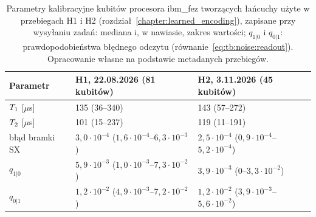 \begin{table}[tb]
\centering
\caption[Parametry kalibracyjne kubitów procesora ibm\_fez w dniach przebiegów H1 i H2]{Parametry kalibracyjne kubitów procesora ibm\_fez tworzących łańcuchy użyte w przebiegach H1 i H2 (rozdział~\ref{chapter:learned_encoding}), zapisane przy wysyłaniu zadań: mediana i, w nawiasie, zakres wartości; $q_{1|0}$ i $q_{0|1}$: prawdopodobieństwa błędnego odczytu (równanie~\eqref{eq:tb:noise:readout}).
Opracowanie własne na podstawie metadanych przebiegów.}
\label{tab:app:env:calibration}
\footnotesize
\begin{tabular}{@{}lll@{}}
\toprule
\textbf{Parametr} & \textbf{H1, 22.08.2026 (81 kubitów)} & \textbf{H2, 3.11.2026 (45 kubitów)} \\
\midrule
$T_1$ [$\mu$s] & 135 (36--340) & 143 (57--272) \\
$T_2$ [$\mu$s] & 101 (15--237) & 119 (11--191) \\
błąd bramki $\mathrm{SX}$ & $3{,}0\cdot10^{-4}$ ($1{,}6\cdot10^{-4}$--$6{,}3\cdot10^{-3}$) & $2{,}5\cdot10^{-4}$ ($0{,}9\cdot10^{-4}$--$5{,}2\cdot10^{-4}$) \\
$q_{1|0}$ & $5{,}9\cdot10^{-3}$ ($1{,}0\cdot10^{-3}$--$7{,}3\cdot10^{-2}$) & $3{,}9\cdot10^{-3}$ ($0$--$3{,}3\cdot10^{-2}$) \\
$q_{0|1}$ & $1{,}2\cdot10^{-2}$ ($4{,}9\cdot10^{-3}$--$7{,}2\cdot10^{-2}$) & $1{,}2\cdot10^{-2}$ ($3{,}9\cdot10^{-3}$--$5{,}6\cdot10^{-2}$) \\
\bottomrule
\end{tabular}
\end{table}

